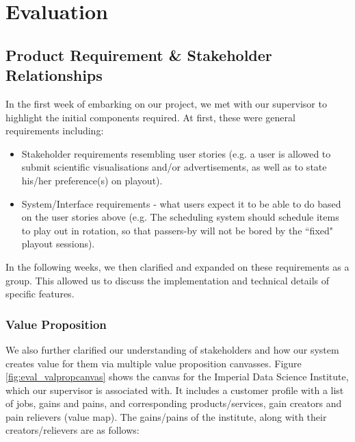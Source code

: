 \documentclass[a4paper, titlepage]{article}
\begin{document}
\newpage
\section{Evaluation}

\subsection{Product Requirement \& Stakeholder Relationships}

In the first week of embarking on our project, we met with our supervisor to highlight the initial components required. At first, these were general
requirements including:

\begin{itemize}

  \item Stakeholder requirements resembling user stories (e.g. a user is allowed to submit scientific visualisations and/or advertisements, as well as to state his/her preference(s) on playout).

  \item System/Interface requirements - what users expect it to be able to do based on the user stories above (e.g. The scheduling system should schedule items to play out in rotation, so that passers-by will not be bored by the ``fixed" playout sessions).

\end{itemize}

In the following weeks, we then clarified and expanded on these requirements as a group. This allowed us to discuss the implementation and technical details of specific features.

\subsubsection{Value Proposition}

We also further clarified our understanding of stakeholders and how our system creates value for them via multiple value proposition canvasses. Figure \ref{fig:eval_valpropcanvas} shows the canvas for the Imperial Data Science Institute, which our supervisor is associated with. It includes a customer profile with a list of jobs, gains and pains, and corresponding products/services, gain creators and pain relievers (value map). The gains/pains of the institute, along with their creators/relievers are as follows:
\end{document}
